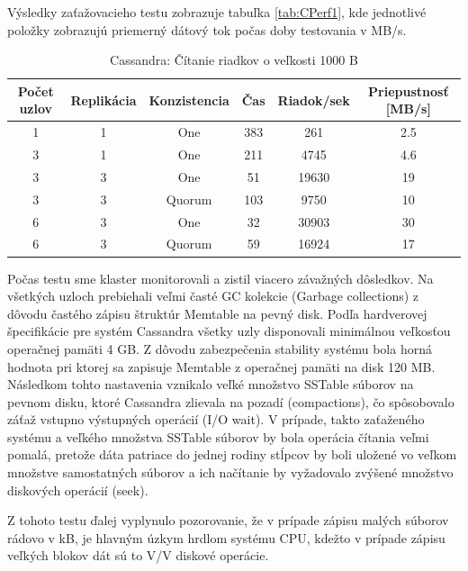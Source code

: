 \documentclass[11pt,twoside,a4paper]{book}
\begin{document}
Výsledky zaťažovacieho testu zobrazuje tabuľka \ref{tab:CPerf1}, kde jednotlivé položky zobrazujú priemerný dátový tok počas doby testovania v MB/s.
\begin{table}[hp]
\begin{center}
\begin{tabular}{|c|c|c|c|c|c|}
\hline Počet uzlov & Replikácia & Konzistencia & Čas & Riadok/sek & Priepustnosť [MB/s]\\ 
\hline
\hline 1 & 1 & One & 383 & 261 & 2.5\\ 
\hline 3 & 1 & One & 211 & 4745 & 4.6\\ 
\hline 3 & 3 & One & 51 & 19630 & 19\\ 
\hline 3 & 3 & Quorum & 103 & 9750 & 10\\ 
\hline 6 & 3 & One & 32 & 30903 & 30\\ 
\hline 6 & 3 & Quorum & 59 & 16924 & 17\\ 
\hline
\end{tabular} 
\end{center}
\caption{Cassandra: Čítanie riadkov o veľkosti 1000 B}
\label{tab:CPerf3}
\end{table}
Počas testu sme klaster monitorovali a zistil viacero závažných dôsledkov. Na všetkých uzloch prebiehali veľmi časté GC kolekcie (Garbage collections) z dôvodu častého zápisu štruktúr Memtable na pevný disk. Podľa hardverovej špecifikácie pre systém Cassandra všetky uzly disponovali minimálnou veľkosťou operačnej pamäti 4 GB. Z dôvodu zabezpečenia stability systému bola horná hodnota pri ktorej sa zapisuje Memtable z operačnej pamäti na disk 120 MB. Následkom tohto nastavenia vznikalo veľké množstvo SSTable súborov na pevnom disku, ktoré Cassandra zlievala na pozadí (compactions), čo spôsobovalo záťaž vstupno výstupných operácií (I/O wait). V prípade, takto zaťaženého systému a veľkého množstva SSTable súborov by bola operácia čítania veľmi pomalá, pretože dáta patriace do jednej rodiny stĺpcov by boli uložené vo veľkom množstve samostatných súborov a ich načítanie by vyžadovalo zvýšené množstvo diskových operácií (seek).

Z tohoto testu ďalej vyplynulo pozorovanie, že v prípade zápisu malých súborov rádovo v kB, je hlavným úzkym hrdlom systému CPU, kdežto v prípade zápisu veľkých blokov dát sú to V/V diskové operácie.
\end{document}
